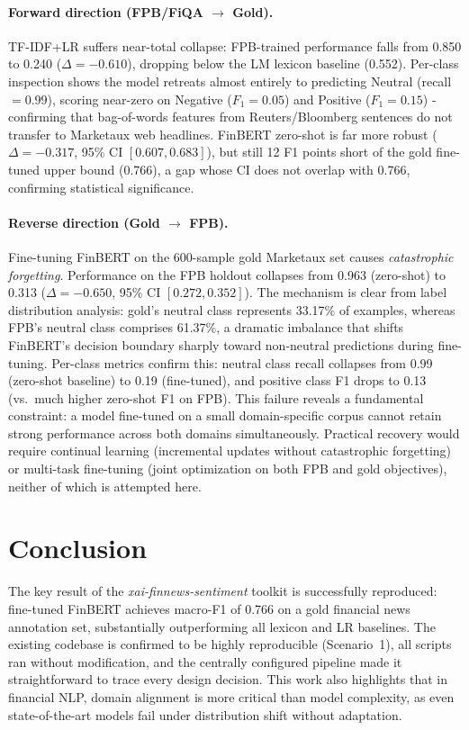 \documentclass[11pt]{article}
\begin{document}
\paragraph{Forward direction (FPB/FiQA $\to$ Gold).}
TF-IDF+LR suffers near-total collapse: FPB-trained performance falls from
0.850 to 0.240 ($\Delta=-0.610$), dropping below the LM lexicon baseline
(0.552). Per-class inspection shows the model retreats almost entirely to
predicting Neutral (recall $=0.99$), scoring near-zero on Negative
($F_1=0.05$) and Positive ($F_1=0.15$) - confirming that bag-of-words
features from Reuters/Bloomberg sentences do not transfer to Marketaux web
headlines. FinBERT zero-shot is far more robust ($\Delta=-0.317$, 95\% CI
$[0.607, 0.683]$), but still 12 F1 points short of the gold fine-tuned upper
bound (0.766), a gap whose CI does not overlap with 0.766, confirming
statistical significance.

\paragraph{Reverse direction (Gold $\to$ FPB).}
Fine-tuning FinBERT on the 600-sample gold Marketaux set causes
\textit{catastrophic forgetting}. Performance on the FPB holdout collapses
from 0.963 (zero-shot) to 0.313 ($\Delta=-0.650$, 95\% CI $[0.272, 0.352]$).
The mechanism is clear from label distribution
analysis: gold's neutral class represents 33.17\% of examples, whereas FPB's
neutral class comprises 61.37\%, a dramatic imbalance that shifts FinBERT's
decision boundary sharply toward non-neutral predictions during fine-tuning.
Per-class metrics confirm this: neutral class recall collapses from 0.99
(zero-shot baseline) to 0.19 (fine-tuned), and positive class F1 drops to
0.13 (vs.\ much higher zero-shot F1 on FPB). This failure reveals a fundamental
constraint: a model fine-tuned on a small domain-specific corpus cannot retain
strong performance across both domains simultaneously. Practical recovery would
require continual learning (incremental updates without catastrophic forgetting)
or multi-task fine-tuning (joint optimization on both FPB and gold objectives),
neither of which is attempted here.

\section{Conclusion}
\label{sec:conclusion}

The key result of the \textit{xai-finnews-sentiment}
toolkit is successfully reproduced: fine-tuned FinBERT achieves macro-F1 of 0.766 on a gold financial
news annotation set, substantially outperforming all lexicon and LR baselines.
The existing codebase is confirmed to be highly reproducible
(Scenario~1), all scripts ran without modification, and the centrally
configured pipeline made it straightforward to trace every design decision. This work also highlights that in financial NLP, 
domain alignment is more critical than model complexity, as even state-of-the-art models fail 
under distribution shift without adaptation.
\end{document}
